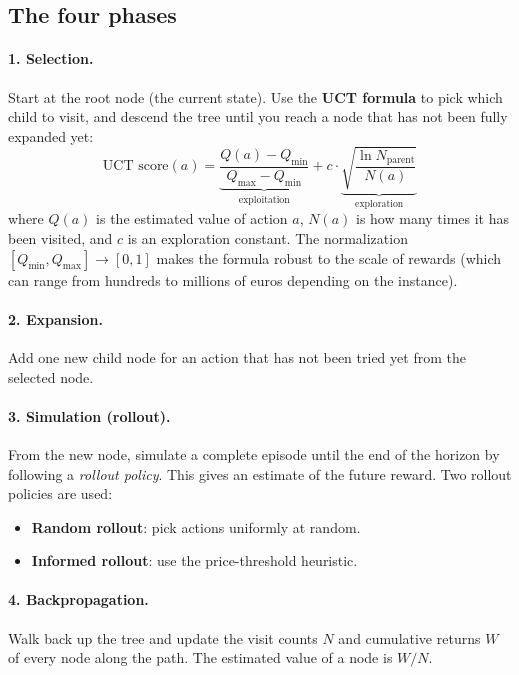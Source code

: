 \documentclass[12pt,a4paper]{article}
\begin{document}
\subsection{The four phases}

\paragraph{1. Selection.} Start at the root node (the current state). Use the
\textbf{UCT formula} to pick which child to visit, and descend the tree until
you reach a node that has not been fully expanded yet:
\begin{equation}
  \text{UCT score}(a) = \underbrace{\frac{Q(a) - Q_{\min}}{Q_{\max} - Q_{\min}}}_{\text{exploitation}}
    + c \cdot \underbrace{\sqrt{\frac{\ln N_{\text{parent}}}{N(a)}}}_{\text{exploration}}
\end{equation}
where $Q(a)$ is the estimated value of action $a$, $N(a)$ is how many times
it has been visited, and $c$ is an exploration constant. The normalization
$[Q_{\min}, Q_{\max}] \to [0,1]$ makes the formula robust to the scale of
rewards (which can range from hundreds to millions of euros depending on the
instance).

\paragraph{2. Expansion.} Add one new child node for an action that has not
been tried yet from the selected node.

\paragraph{3. Simulation (rollout).} From the new node, simulate a complete
episode until the end of the horizon by following a \emph{rollout policy}.
This gives an estimate of the future reward. Two rollout policies are used:
\begin{itemize}
  \item \textbf{Random rollout}: pick actions uniformly at random.
  \item \textbf{Informed rollout}: use the price-threshold heuristic.
\end{itemize}

\paragraph{4. Backpropagation.} Walk back up the tree and update the visit
counts $N$ and cumulative returns $W$ of every node along the path. The
estimated value of a node is $W/N$.
\end{document}
